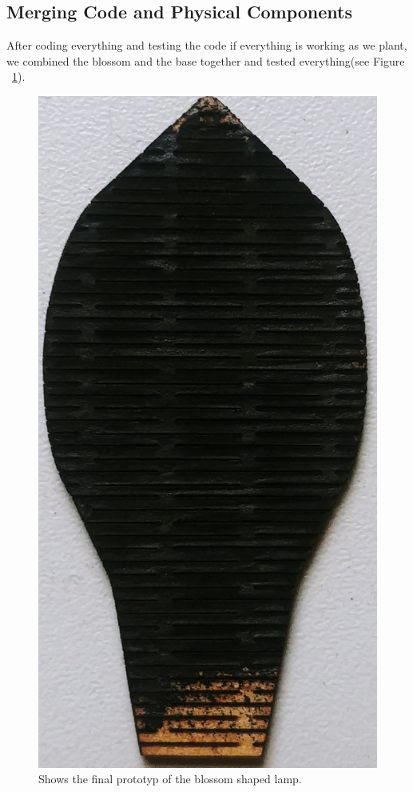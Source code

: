 \documentclass[04_projectProcess.tex]{subfiles}
\begin{document}
    \subsection{Merging Code and Physical Components}
    \begin{flushleft}
        After coding everything and testing the code if everything is working as we plant, we combined
        the blossom and the base together and tested everything(see Figure ~\ref{fig:finalPrototyp}).
    \end{flushleft}

    \begin{figure}[h!]
        \centering
        \includegraphics[scale=0.05]{images/materialProcess/07_LaserCut.jpg}
        \caption{Shows the final prototyp of the blossom shaped lamp.}
        \label{fig:finalPrototyp}
    \end{figure}
\end{document}
